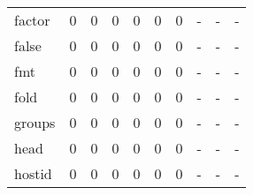 \begin{longtable}{lp{1.3cm}p{1.3cm}p{1.3cm}p{1.3cm}p{1.3cm}p{1.3cm}p{1.3cm}p{1.3cm}p{1.3cm}}
factor    &                      0 &                                  0 &                                 0 &                                0 &                                 0 &                               0 &                                    - &                                      - &                                    - \\
false     &                      0 &                                  0 &                                 0 &                                0 &                                 0 &                               0 &                                    - &                                      - &                                    - \\
fmt       &                      0 &                                  0 &                                 0 &                                0 &                                 0 &                               0 &                                    - &                                      - &                                    - \\
fold      &                      0 &                                  0 &                                 0 &                                0 &                                 0 &                               0 &                                    - &                                      - &                                    - \\
groups    &                      0 &                                  0 &                                 0 &                                0 &                                 0 &                               0 &                                    - &                                      - &                                    - \\
head      &                      0 &                                  0 &                                 0 &                                0 &                                 0 &                               0 &                                    - &                                      - &                                    - \\
hostid    &                      0 &                                  0 &                                 0 &                                0 &                                 0 &                               0 &                                    - &                                      - &                                    - \\

\end{longtable}

